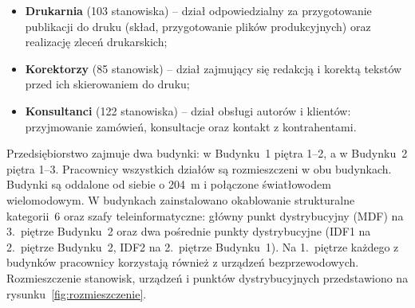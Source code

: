 \documentclass[12pt,a4paper]{article}
\begin{document}
\begin{itemize}
  \item \textbf{Drukarnia} (103 stanowiska) -- dział odpowiedzialny za
  przygotowanie publikacji do druku (skład, przygotowanie plików produkcyjnych)
  oraz realizację zleceń drukarskich;
  \item \textbf{Korektorzy} (85 stanowisk) -- dział zajmujący się redakcją
  i korektą tekstów przed ich skierowaniem do druku;
  \item \textbf{Konsultanci} (122 stanowiska) -- dział obsługi autorów
  i klientów: przyjmowanie zamówień, konsultacje oraz kontakt z kontrahentami.
\end{itemize}

Przedsiębiorstwo zajmuje dwa budynki: w Budynku~1 piętra 1--2, a w
Budynku~2 piętra 1--3. Pracownicy wszystkich działów są rozmieszczeni
w obu budynkach. Budynki są oddalone od siebie o 204~m i połączone
światłowodem wielomodowym.
W budynkach zainstalowano okablowanie strukturalne kategorii~6 oraz szafy
teleinformatyczne: główny punkt dystrybucyjny (MDF) na 3.~piętrze Budynku~2
oraz dwa pośrednie punkty dystrybucyjne (IDF1 na 2.~piętrze Budynku~2,
IDF2 na 2.~piętrze Budynku~1). Na 1.~piętrze każdego z budynków pracownicy
korzystają również z urządzeń bezprzewodowych. Rozmieszczenie stanowisk,
urządzeń i punktów dystrybucyjnych przedstawiono na rysunku~\ref{fig:rozmieszczenie}.
\end{document}

